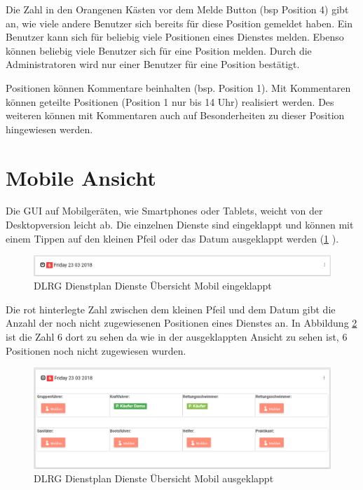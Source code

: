 \noindent Die Zahl in den Orangenen Kästen vor dem Melde Button (bsp Position 4) gibt an, wie viele andere Benutzer sich bereits für diese Position gemeldet haben. Ein Benutzer kann sich für beliebig viele Positionen eines Dienstes melden. Ebenso können beliebig viele Benutzer sich für eine Position melden. Durch die Administratoren wird nur einer Benutzer für eine Position bestätigt.

\noindent Positionen können Kommentare beinhalten (bsp. Position 1). Mit Kommentaren können geteilte Positionen (Position 1 nur bis 14 Uhr) realisiert werden. Des weiteren können mit Kommentaren auch auf Besonderheiten zu dieser Position hingewiesen werden.


\section{Mobile Ansicht}
\label{sec:dienste_mobile}
Die GUI auf Mobilgeräten, wie \zB Smartphones oder Tablets, weicht von der Desktopversion leicht ab. Die einzelnen Dienste sind eingeklappt und können mit einem Tippen auf den kleinen Pfeil oder das Datum ausgeklappt werden (\ref{fig:view_service_mobile_close} \textit{}). 


\begin{figure}[h]
 \begin{addmargin}{-0.2\linewidth}
   \centering 
   \includegraphics[width=20cm]{Bilder/view_service_mobile_close.png}
 \end{addmargin} 
 \caption[Dienste Übersicht Mobil]{DLRG Dienstplan Dienste Übersicht Mobil eingeklappt}
 \label{fig:view_service_mobile_close}
\end{figure}


\noindent Die rot hinterlegte Zahl zwischen dem kleinen Pfeil und dem Datum gibt die Anzahl der noch nicht zugewiesenen Positionen eines Dienstes an. In Abbildung \ref{fig:view_service_mobile} \textit{} ist die Zahl 6 dort zu sehen da wie in der ausgeklappten Ansicht zu sehen ist, 6 Positionen noch nicht zugewiesen wurden.

\begin{figure}[h]
 \begin{addmargin}{-0.2\linewidth}
   \centering 
   \includegraphics[width=20cm]{Bilder/view_service_mobile.png}
 \end{addmargin} 
 \caption[Dienste Übersicht Mobil Ausgeklappt]{DLRG Dienstplan Dienste Übersicht Mobil ausgeklappt}
 \label{fig:view_service_mobile}
\end{figure}